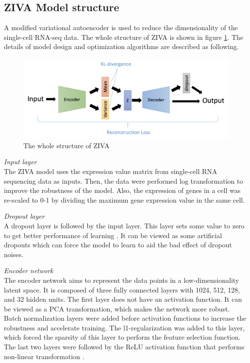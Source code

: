 \subsection{ZIVA Model structure}
A modified variational autoencoder \cite{Kingma2014} is used to reduce the dimensionality of the single-cell RNA-seq data. The whole structure of ZIVA is shown in figure \ref{modelstru}. The details of model design and optimization algorithms are described as following. 
\begin{figure}[htb!]
    \centering
    \includegraphics[width=1\textwidth]{figures/myfigures/ZIVA.png}
    \caption{The whole structure of ZIVA}
    \label{modelstru}
\end{figure}

\vspace{0.5cm}
\noindent\emph{Input layer} \\ The ZIVA model uses the expression value matrix from single-cell RNA sequencing data as inputs. Then, the data were performed log transformation to improve the robustness of the model.  Also, the expression of genes in a cell was re-scaled to 0-1 by dividing the maximum gene expression value in the same cell. 

\vspace{0.5cm}
\noindent\emph{Dropout layer} \\ A dropout layer \cite{baldi2013understanding} is followed by the input layer. This layer sets some value to zero to get better performance of learning \cite{vincent2008extracting}. It can be viewed as some artificial dropouts which can force the model to learn to aid the bad effect of dropout noises. 

\vspace{0.5cm}
\noindent\emph{Encoder network} \\
The encoder network aims to represent the data points in a low-dimensionality latent space. It is composed of three fully connected layers with 1024, 512, 128, and 32 hidden units. The first layer does not have an activation function. It can be viewed as a PCA transformation, which makes the network more robust. Batch normalization \cite{ioffe2015batch} layers were added before activation functions to increase the robustness and accelerate training. The l1-regularization was added to this layer, which forced the sparsity of this layer to perform the feature selection function. The last two layers were followed by the ReLU activation function that performs non-linear transformation \cite{krizhevsky2012imagenet}.

